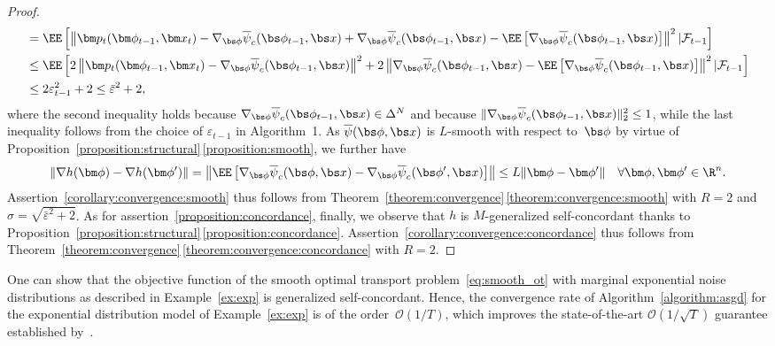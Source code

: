 \documentclass[11pt, a4paper, oneside, reqno]{article}
\begin{document}
\begin{proof}
\begin{align*}
	        &= \EE \left[\left\| \bm p_t(\bm \phi_{t-1}, \bm x_t) - \nabla_{\bs \phi} \overline\psi_c(\bs \phi_{t-1}, \bs x) + \nabla_{\bs \phi} \overline\psi_c(\bs \phi_{t-1}, \bs x) - \EE \left[ \nabla_{\bs \phi} \overline\psi_c(\bs \phi_{t-1}, \bs x) \right] \right\|^2 | \mathcal F_{t-1} \right] \\
	        & \leq \EE \left[ 2 \left\| \bm p_t(\bm \phi_{t-1}, \bm x_t) - \nabla_{\bs \phi} \overline\psi_c(\bs \phi_{t-1}, \bs x) \right\|^2 + 2 \left\| \nabla_{\bs \phi} \overline\psi_c(\bs \phi_{t-1}, \bs x) - \EE \left[ \nabla_{\bs \phi} \overline\psi_c(\bs \phi_{t-1}, \bs x) \right] \right\|^2 | \mathcal F_{t-1} \right] \\
	        & \leq 2\varepsilon_{t-1}^2 + 2 \leq \bar \varepsilon^2 + 2,
	    \end{align*}
	    where the second inequality holds because $\nabla_{\bs \phi} \overline\psi_c(\bs \phi_{t-1}, \bs x) \in \Delta^N$ and because $\| \nabla_{\bs \phi} \overline\psi_c(\bs \phi_{t-1}, \bs x) \|_2^2 \leq 1$, while the last inequality follows from the choice of $\varepsilon_{t-1}$ in Algorithm~1.
	    As $\overline\psi(\bs \phi, \bs x)$ is $L$-smooth with respect to~$\bs \phi$ by virtue of Proposition~\ref{proposition:structural}\,\ref{proposition:smooth}, we further have
	    \begin{align*}
	        \| \nabla h(\bm \phi) - \nabla h(\bm \phi') \| = \left\| \EE \left[ \nabla_{\bs \phi} \overline\psi_c(\bs \phi, \bs x) - \nabla_{\bs \phi} \overline\psi_c(\bs \phi', \bs x) \right] \right\| \leq L \| \bm \phi - \bm \phi' \| \quad \forall \bm \phi, \bm \phi' \in \R^n.
	    \end{align*}
	    Assertion~\ref{corollary:convergence:smooth} thus follows from Theorem~\ref{theorem:convergence}\,\ref{theorem:convergence:smooth} with $R=2$ and $\sigma = \sqrt{\bar \varepsilon^2 + 2}$.
	    As for assertion~\ref{proposition:concordance}, finally, we observe that $h$ is $M$-generalized self-concordant thanks to Proposition~\ref{proposition:structural}\,\ref{proposition:concordance}. Assertion~\ref{corollary:convergence:concordance} thus follows from Theorem~\ref{theorem:convergence}\,\ref{theorem:convergence:concordance} with $R=2$.
	\end{proof}
	One can show that the objective function of the smooth optimal transport problem~\eqref{eq:smooth_ot} with marginal exponential noise distributions as described in Example~\ref{ex:exp} is generalized self-concordant. Hence, the convergence rate of Algorithm~\ref{algorithm:asgd} for the exponential distribution model of Example~\ref{ex:exp} is of the order~$\mathcal O(1/T)$, which improves the state-of-the-art $\mathcal O(1/\sqrt{T})$ guarantee established by~\citet{genevay2016stochastic}.
	
\end{document}
